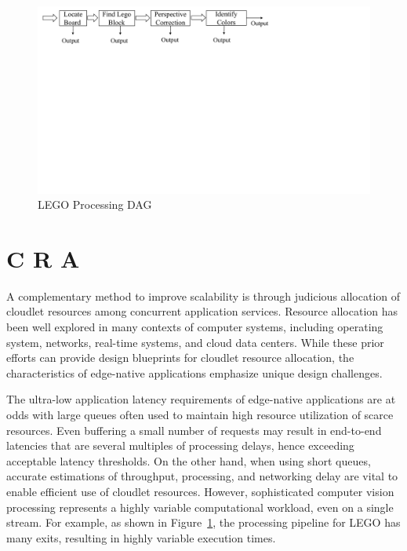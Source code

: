 \begin{figure}
\centering
\includegraphics[width=\linewidth, trim=0em 42.8em 31.5em 1em, clip]{FIGS/fig-lego-dag.pdf}
\vspace{-0.2in}
\caption{LEGO Processing DAG}
\label{fig:lego-dag}
\vspace{-0.2in}
\end{figure}

\section{C R A}
\label{sec: resource-allocation}

A complementary method to improve scalability is through judicious
allocation of cloudlet resources among concurrent application
services. Resource allocation has been well explored in many contexts
of computer systems, including operating system, networks, real-time
systems, and cloud data centers.  While these prior efforts can
provide design blueprints for cloudlet resource allocation, the
characteristics of edge-native applications emphasize unique design
challenges.

The ultra-low application latency requirements of edge-native
applications are at odds with large queues often used to maintain high
resource utilization of scarce resources.  Even buffering a small
number of requests may result in end-to-end latencies that are several
multiples of processing delays, hence exceeding acceptable latency
thresholds.  On the other hand, when using short queues, accurate
estimations of throughput, processing, and networking delay are vital
to enable efficient use of cloudlet resources.  However, sophisticated
computer vision processing represents a highly variable computational
workload, even on a single stream. For example, as shown in
Figure~\ref{fig:lego-dag}, the processing pipeline for LEGO has many
exits, resulting in highly variable execution times.

